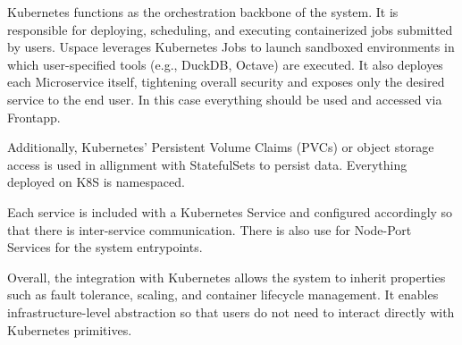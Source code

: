 Kubernetes functions as the orchestration backbone of the system. It is responsible for deploying, scheduling, and executing containerized jobs 
submitted by users. Uspace leverages Kubernetes Jobs to launch sandboxed environments in which user-specified tools (e.g., DuckDB, Octave) are 
executed. It also deployes each Microservice itself, tightening overall security and exposes only the desired service to the end user. In 
this case everything should be used and accessed via Frontapp.

Additionally, Kubernetes' Persistent Volume Claims (PVCs) or object storage access is used in allignment with StatefulSets to persist data. 
Everything deployed on K8S is namespaced. 

Each service is included with a Kubernetes Service and configured accordingly so that there is inter-service communication. There is also use 
for Node-Port Services for the system entrypoints.

Overall, the integration with Kubernetes allows the system to inherit properties such as fault tolerance, scaling, and container lifecycle management. 
It enables infrastructure-level abstraction so that users do not need to interact directly with Kubernetes primitives.
